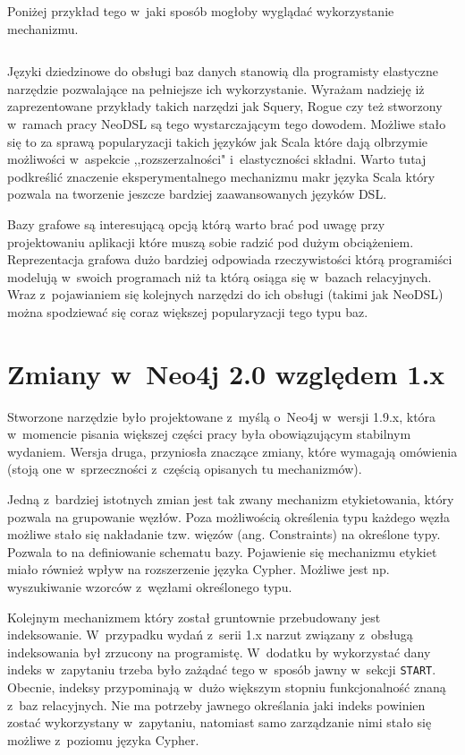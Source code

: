 \documentclass[brudnopis]{xmgr}
\begin{document}
\medskip\noindent Poniżej przykład tego w~jaki sposób mogłoby wyglądać wykorzystanie mechanizmu.

\inputminted{scala}{listings/scala/missing-query-features.scala}

\summary

Języki dziedzinowe do obsługi baz danych stanowią dla programisty elastyczne narzędzie pozwalające na pełniejsze ich wykorzystanie. Wyrażam nadzieję iż zaprezentowane przykłady takich narzędzi jak Squery, Rogue czy też stworzony w~ramach pracy NeoDSL są tego wystarczającym tego dowodem. Możliwe stało się to za sprawą popularyzacji takich języków jak Scala które dają olbrzymie możliwości w~aspekcie ,,rozszerzalności" i~elastyczności składni. Warto tutaj podkreślić znaczenie eksperymentalnego mechanizmu makr języka Scala który pozwala na tworzenie jeszcze bardziej zaawansowanych języków DSL. 

Bazy grafowe są interesującą opcją którą warto brać pod uwagę przy projektowaniu aplikacji które muszą sobie radzić pod dużym obciążeniem. Reprezentacja grafowa dużo bardziej odpowiada rzeczywistości którą programiści modelują w~swoich programach niż ta którą osiąga się w~bazach relacyjnych. Wraz z~pojawianiem się kolejnych narzędzi do ich obsługi (takimi jak NeoDSL) można spodziewać się coraz większej popularyzacji tego typu baz.

\appendix
\chapter{Zmiany w~Neo4j 2.0 względem 1.x}

Stworzone narzędzie było projektowane z~myślą o~Neo4j w~wersji 1.9.x, która w~momencie pisania większej części pracy była obowiązującym stabilnym wydaniem. Wersja druga, przyniosła znaczące zmiany, które wymagają omówienia (stoją one w~sprzeczności z~częścią opisanych tu mechanizmów).

Jedną z~bardziej istotnych zmian jest tak zwany mechanizm etykietowania, który pozwala na grupowanie węzłów. Poza możliwością określenia typu każdego węzła możliwe stało się nakładanie tzw. więzów (ang. Constraints) na określone typy. Pozwala to na definiowanie schematu bazy. Pojawienie się mechanizmu etykiet miało również wpływ na rozszerzenie języka Cypher. Możliwe jest np. wyszukiwanie wzorców z~węzłami określonego typu.

Kolejnym mechanizmem który został gruntownie przebudowany jest indeksowanie. W~przypadku wydań z~serii 1.x narzut związany z~obsługą indeksowania był zrzucony na programistę. W~dodatku by wykorzystać dany indeks w~zapytaniu trzeba było zażądać tego w~sposób jawny w~sekcji \texttt{START}. Obecnie, indeksy przypominają w~dużo większym stopniu funkcjonalność znaną z~baz relacyjnych. Nie ma potrzeby jawnego określania jaki indeks powinien zostać wykorzystany w~zapytaniu, natomiast samo zarządzanie nimi stało się możliwe z~poziomu języka Cypher.
\end{document}
